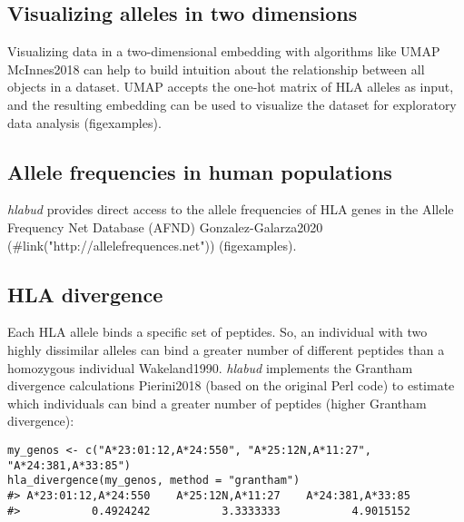 \subsection{Visualizing alleles in two dimensions}

Visualizing data in a two-dimensional embedding with algorithms like UMAP McInnes2018 can help to build intuition about the relationship between all objects in a dataset.
UMAP accepts the one-hot matrix of HLA alleles as input, and the resulting embedding can be used to visualize the dataset for exploratory data analysis (figexamples\B).

\subsection{Allele frequencies in human populations}

\textit{hlabud} provides direct access to the allele frequencies of HLA genes in the Allele Frequency Net Database (AFND) Gonzalez-Galarza2020 (#link("http://allelefrequences.net")) (figexamples\C).

\subsection{HLA divergence}

Each HLA allele binds a specific set of peptides.
So, an individual with two highly dissimilar alleles can bind a greater number of different peptides than a homozygous individual Wakeland1990.
\textit{hlabud} implements the Grantham divergence calculations Pierini2018 (based on the original Perl code) to estimate which individuals can bind a greater number of peptides (higher Grantham divergence):

\begin{verbatim}
my_genos <- c("A*23:01:12,A*24:550", "A*25:12N,A*11:27", "A*24:381,A*33:85")
hla_divergence(my_genos, method = "grantham")
#> A*23:01:12,A*24:550    A*25:12N,A*11:27    A*24:381,A*33:85 
#>           0.4924242           3.3333333           4.9015152 
\end{verbatim}


